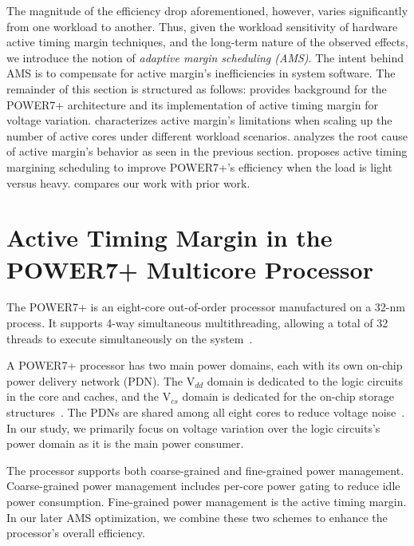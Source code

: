 The magnitude of the efficiency drop aforementioned, however, varies significantly from one workload to another. Thus, given the workload sensitivity of hardware active timing margin techniques, and the long-term nature of the observed effects, we introduce the notion of \emph{adaptive margin scheduling (AMS)}. The intent behind AMS is to compensate for active margin's inefficiencies in system software. The remainder of this section is structured as follows:  provides background for the POWER7+ architecture and its implementation of active timing margin for voltage variation.  characterizes active margin's limitations when scaling up the number of active cores under different workload scenarios.  analyzes the root cause of active margin's behavior as seen in the previous section.  proposes active timing margining scheduling to improve POWER7+'s efficiency when the load is light versus heavy.  compares our work with prior work.

\section{Active Timing Margin in the POWER7+ Multicore Processor}
\label{sec:voltage:background}


The POWER7+ is an eight-core out-of-order processor manufactured on a 32-nm process. It supports 4-way simultaneous multithreading, allowing a total of 32 threads to execute simultaneously on the system~\cite{manousopoulos2012characterizing}.

A POWER7+ processor has two main power domains, each with its own on-chip power delivery network (PDN). The V$_{dd}$ domain is dedicated to the logic circuits in the core and caches, and the V$_{cs}$ domain is dedicated for the on-chip storage structures~\cite{zyuban2013ibm,barth201045nm}. The PDNs are shared among all eight cores to reduce voltage noise~\cite{james2007comparison}. In our study, we primarily focus on voltage variation over the logic circuits's power domain as it is the main power consumer.

The processor supports both coarse-grained and fine-grained power management. Coarse-grained power management includes per-core power gating to reduce idle power consumption. Fine-grained power management is the active timing margin. In our later AMS optimization, we combine these two schemes to enhance the processor's overall efficiency.

